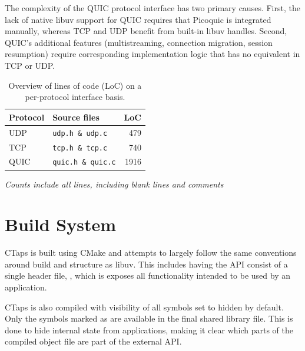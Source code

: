The complexity of the QUIC protocol interface has two primary causes. First, the lack of native libuv support 
for QUIC requires that Picoquic is integrated manually, whereas TCP and UDP benefit 
from built-in libuv handles. Second, QUIC's additional features (multistreaming, 
connection migration, session resumption) require corresponding implementation 
logic that has no equivalent in TCP or UDP.

\begin{table}[htbp]
\centering
\begin{threeparttable}
\caption[Lines of code for CTaps protocol interfaces]{Overview of lines of code (LoC) on a per-protocol interface basis.}
\label{tab:protocolLoc}
\small
\begin{tabular}{llr}
\toprule
\rowcolor{gray!25}
\textbf{Protocol} & \textbf{Source files} & \textbf{LoC} \\
\midrule
\multicolumn{1}{l|}{UDP}  & \multicolumn{1}{l||}{\texttt{udp.h \& udp.c}}   & 479 \\
\multicolumn{1}{l|}{TCP}  & \multicolumn{1}{l||}{\texttt{tcp.h \& tcp.c}}   & 740 \\
\multicolumn{1}{l|}{QUIC} & \multicolumn{1}{l||}{\texttt{quic.h \& quic.c}}  & 1916 \\
\bottomrule
\end{tabular}
\begin{tablenotes}
    \footnotesize
  \item \textit{Counts include all lines, including blank lines and comments}
\end{tablenotes}
\end{threeparttable}
\end{table}

\section{Build System} \label{sec:build-system}
CTaps is built using CMake and attempts to largely follow the same conventions
around build and structure as libuv. This includes
having the API consist of a single header file, , which
is exposes all functionality intended to be used by an application.

CTaps is also compiled with visibility of all symbols set to hidden by default.
Only the symbols marked as  are available in the final
shared library file. This is done to hide internal state from applications,
making it clear which parts of the compiled object file are part of the
external API.

